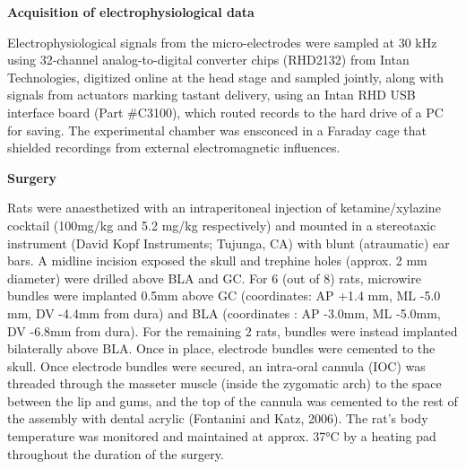 \begin{refsection}
\smallskip
\noindent\textbf{Acquisition of electrophysiological data }\par
\noindent Electrophysiological signals from the micro-electrodes were sampled at 30 kHz using 32-channel analog-to-digital converter chips (RHD2132) from Intan Technologies, digitized online at the head stage and sampled jointly, along with signals from actuators marking tastant delivery, using an Intan RHD USB interface board (Part \#C3100), which routed records to the hard drive of a PC for saving. The experimental chamber was ensconced in a Faraday cage that shielded recordings from external electromagnetic influences.

\smallskip
\noindent\textbf{Surgery}\par
\noindent Rats were anaesthetized with an intraperitoneal injection of ketamine/xylazine cocktail (100mg/kg and 5.2 mg/kg respectively) and mounted in a stereotaxic instrument (David Kopf Instruments; Tujunga, CA) with blunt (atraumatic) ear bars. A midline incision exposed the skull and trephine holes (approx. 2 mm diameter) were drilled above BLA and GC. For 6 (out of 8) rats, microwire bundles were implanted 0.5mm above GC (coordinates: AP +1.4 mm, ML -5.0 mm, DV -4.4mm from dura) and BLA (coordinates : AP -3.0mm, ML -5.0mm, DV -6.8mm from dura). For the remaining 2 rats, bundles were instead implanted bilaterally above BLA. Once in place, electrode bundles were cemented to the skull. Once electrode bundles were secured, an intra-oral cannula (IOC) was threaded through the masseter muscle (inside the zygomatic arch) to the space between the lip and gums, and the top of the cannula was cemented to the rest of the assembly with dental acrylic (Fontanini and Katz, 2006). The rat’s body temperature was monitored and maintained at approx. 37°C by a heating pad throughout the duration of the surgery.


\end{refsection}
